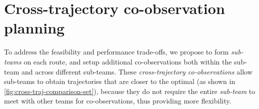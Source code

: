 \documentclass[10pt,twocolumn,twoside]{IEEEtran}
\begin{document}

\section{Cross-trajectory co-observation planning}\label{sec:cross-trajectory}
To address the feasibility and performance trade-offs, we propose to form \emph{sub-teams} on each route, and setup additional co-observations both within the sub-team and across different sub-teams. These \emph{cross-trajectory co-observations} allow sub-teams to obtain trajectories that are closer to the optimal (as shown in \cref{fig:cross-traj-comparison-set}), because they do not require the entire \emph{sub-team} to meet with other teams for co-observations, thus providing more flexibility.
\end{document}
